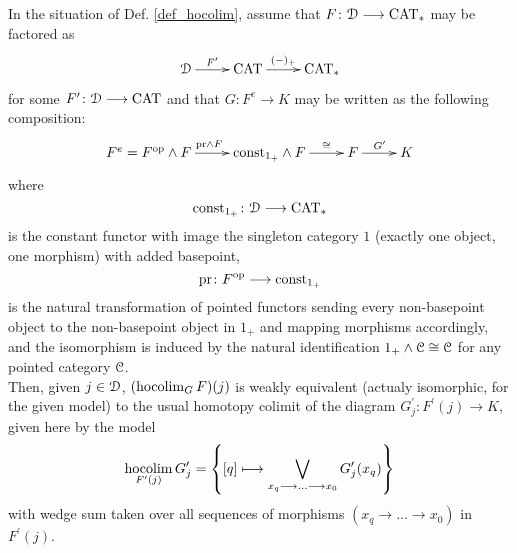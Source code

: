   \begin{lem}\label{lem_hocolim_name_justification}
    In the situation of Def. \ref{def_hocolim}, assume that $F \colon \mathcal{D} \longrightarrow
    \mathrm{CAT}_*$ may be factored as
    \begin{displaymath}
      \xymatrix{
        \cD \ar[r]^-{F^\prime} &
        \CAT \ar[r]^-{(-)_+} &
        \CAT_*
      }
    \end{displaymath}
    for some $F^\prime \colon \mathcal{D} \longrightarrow \mathrm{CAT}$ and that $G \colon F^e \to K$ may
    be written as the following composition:
    \begin{displaymath}
      \xymatrix{
        F^e = F^{\op} \wedge F \ar[r]^{\mathrm{pr} \wedge F} &
        \mathrm{const}_{1_+} \wedge F \ar[r]^-{\cong} &
        F \ar[r]^{G^\prime} &
        K
      }
    \end{displaymath}
    where 
    \begin{displaymath}
      \mathrm{const}_{1_+} \colon \mathcal{D} \longrightarrow \mathrm{CAT}_*
    \end{displaymath}
    is the constant functor with image the singleton category $1$ (exactly one
    object, one morphism) with added basepoint, 
    \begin{displaymath}
      \mathrm{pr} \colon F^{\mathrm{op}} \longrightarrow \mathrm{const}_{1_+}
    \end{displaymath}
    is the natural transformation of pointed functors sending every
    non-basepoint object to the non-basepoint object in $1_+$ and mapping
    morphisms accordingly, and the isomorphism is induced by the natural
    identification $1_+ \wedge \mathcal{C} \cong \mathcal{C}$ for any pointed category
    $\mathcal{C}$.\\
    Then, given $j \in \mathcal{D}$, $(\operatorname*{hocolim}_G F)(j)$ is weakly equivalent (actualy
    isomorphic, for the given model) to the usual homotopy colimit of the
    diagram $G^\prime_j \colon F^\prime(j) \to K$, given here by the model
    \begin{displaymath}
      \operatorname*{hocolim}_{F^\prime(j)} G_j^\prime = \left\{ 
        [q] \longmapsto \bigvee_{x_q \longrightarrow \ldots \longrightarrow x_0} G_j^\prime(x_q)
      \right\}
    \end{displaymath}
    with wedge sum taken over all sequences of morphisms $(x_q \to \ldots \to
    x_0)$ in $F^\prime(j)$.
  \end{lem}
